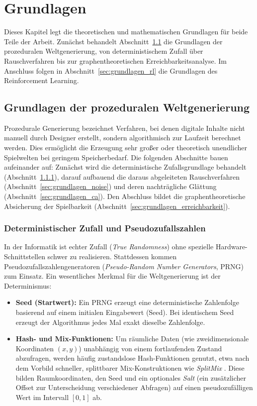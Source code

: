 \documentclass[
  a4paper,
  11pt,
  twoside,
  BCOR=8mm,           %
  headings=big,
  numbers=noenddot,
  listof=totoc,       %
  captions=tableheading,
]{scrreprt}
\begin{document}
\chapter{Grundlagen}
\label{chap:grundlagen}

Dieses Kapitel legt die theoretischen und mathematischen Grundlagen für beide Teile der Arbeit. Zunächst behandelt Abschnitt~\ref{sec:grundlagen_procedural} die Grundlagen der prozeduralen Weltgenerierung, von deterministischem Zufall über Rauschverfahren bis zur graphentheoretischen Erreichbarkeitsanalyse. Im Anschluss folgen in Abschnitt~\ref{sec:grundlagen_rl} die Grundlagen des Reinforcement Learning.

\section{Grundlagen der prozeduralen Weltgenerierung}
\label{sec:grundlagen_procedural}

Prozedurale Generierung bezeichnet Verfahren, bei denen digitale Inhalte nicht manuell durch Designer erstellt, sondern algorithmisch zur Laufzeit berechnet werden. Dies ermöglicht die Erzeugung sehr großer oder theoretisch unendlicher Spielwelten bei geringem Speicherbedarf. Die folgenden Abschnitte bauen aufeinander auf: Zunächst wird die deterministische Zufallsgrundlage behandelt (Abschnitt~\ref{sec:grundlagen_zufall}), darauf aufbauend die daraus abgeleiteten Rauschverfahren (Abschnitt~\ref{sec:grundlagen_noise}) und deren nachträgliche Glättung (Abschnitt~\ref{sec:grundlagen_ca}). Den Abschluss bildet die graphentheoretische Absicherung der Spielbarkeit (Abschnitt~\ref{sec:grundlagen_erreichbarkeit}).

\subsection{Deterministischer Zufall und Pseudozufallszahlen}
\label{sec:grundlagen_zufall}

In der Informatik ist echter Zufall (\textit{True Randomness}) ohne spezielle Hardware-Schnittstellen schwer zu realisieren. Stattdessen kommen Pseudozufallszahlengeneratoren (\textit{Pseudo-Random Number Generators}, PRNG) zum Einsatz. Ein wesentliches Merkmal für die Weltgenerierung ist der Determinismus:

\begin{itemize}
    \item \textbf{Seed (Startwert):} Ein PRNG erzeugt eine deterministische Zahlenfolge basierend auf einem initialen Eingabewert (Seed). Bei identischem Seed erzeugt der Algorithmus jedes Mal exakt dieselbe Zahlenfolge.
    \item \textbf{Hash- und Mix-Funktionen:} Um räumliche Daten (wie zweidimensionale Koordinaten $(x, y)$) unabhängig von einem fortlaufenden Zustand abzufragen, werden häufig zustandslose Hash-Funktionen genutzt, etwa nach dem Vorbild schneller, splittbarer Mix-Konstruktionen wie \textit{SplitMix} \citep{steele2014splitmix}. Diese bilden Raumkoordinaten, den Seed und ein optionales \textit{Salt} (ein zusätzlicher Offset zur Unterscheidung verschiedener Abfragen) auf einen pseudozufälligen Wert im Intervall $[0, 1]$ ab.
\end{itemize}
\end{document}
